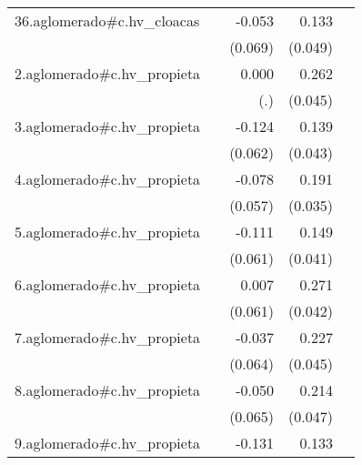 {\begin{longtable}{l*{4}{D{.}{.}{-1}}}
\addlinespace
36.aglomerado#c.hv\_cloacas&                     &      -0.053         &       0.133\sym{**} &                     \\
            &                     &     (0.069)         &     (0.049)         &                     \\
\addlinespace
2.aglomerado#c.hv\_propieta&                     &       0.000         &       0.262\sym{***}&                     \\
            &                     &         (.)         &     (0.045)         &                     \\
\addlinespace
3.aglomerado#c.hv\_propieta&                     &      -0.124\sym{*}  &       0.139\sym{**} &                     \\
            &                     &     (0.062)         &     (0.043)         &                     \\
\addlinespace
4.aglomerado#c.hv\_propieta&                     &      -0.078         &       0.191\sym{***}&                     \\
            &                     &     (0.057)         &     (0.035)         &                     \\
\addlinespace
5.aglomerado#c.hv\_propieta&                     &      -0.111         &       0.149\sym{***}&                     \\
            &                     &     (0.061)         &     (0.041)         &                     \\
\addlinespace
6.aglomerado#c.hv\_propieta&                     &       0.007         &       0.271\sym{***}&                     \\
            &                     &     (0.061)         &     (0.042)         &                     \\
\addlinespace
7.aglomerado#c.hv\_propieta&                     &      -0.037         &       0.227\sym{***}&                     \\
            &                     &     (0.064)         &     (0.045)         &                     \\
\addlinespace
8.aglomerado#c.hv\_propieta&                     &      -0.050         &       0.214\sym{***}&                     \\
            &                     &     (0.065)         &     (0.047)         &                     \\
\addlinespace
9.aglomerado#c.hv\_propieta&                     &      -0.131\sym{*}  &       0.133\sym{**} &                     \\

\end{longtable}}
